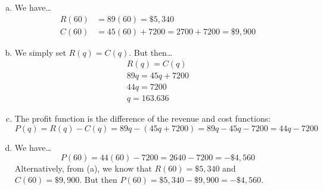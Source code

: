 \documentclass[11pt,letterpaper]{article}
\begin{document}
\sol 
\begin{enumerate}[(a)]
\item We have\dots
	\[
	\begin{aligned}
	R(60)&= 89(60)= \$5,\!340 \\[0.3cm]
	C(60)&= 45(60) + 7200= 2700 + 7200= \$9,\!900
	\end{aligned}
	\] \pspace

\item We simply set $R(q)= C(q)$. But then\dots
	\[
	\begin{gathered}
	R(q)= C(q) \\
	89q= 45q + 7200 \\
	44q= 7200 \\
	q= 163.636
	\end{gathered}
	\] \pspace

\item The profit function is the difference of the revenue and cost functions:
	\[
	P(q)= R(q) - C(q)= 89q - (45q + 7200)= 89q - 45q - 7200= 44q - 7200
	\] \pspace

\item We have\dots
	\[
	P(60)= 44(60) - 7200= 2640 - 7200= -\$4,\!560
	\] \pspace
Alternatively, from (a), we know that $R(60)= \$5,\!340$ and $C(60)= \$9,\!900$. But then $P(60)= \$5,\!340 - \$9,\!900= -\$4,\!560$. 
\end{enumerate}
\end{document}
